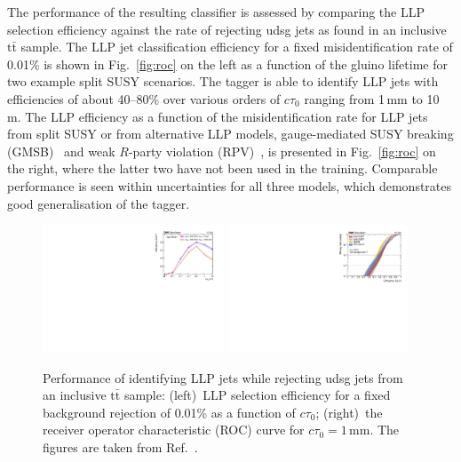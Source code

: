 \documentclass{webofc}
\newcommand{\ctau}{\ensuremath{c\tau_{0}}\xspace}
\newcommand{\ttbar}{\ensuremath{\textrm{t}\bar{\textrm{t}}}\xspace}
\begin{document}
The performance of the resulting classifier is assessed by comparing the LLP selection efficiency against the rate of rejecting udsg jets as found in an inclusive \ttbar sample. The LLP jet classification efficiency for a fixed misidentification rate of 0.01\% is shown in Fig.~\ref{fig:roc} on the left as a function of the gluino lifetime for two example split SUSY scenarios. The tagger is able to identify LLP jets with efficiencies of about 40--80\% over various orders of \ctau ranging from 1\,\textrm{mm} to 10\,\textrm{m}. The LLP efficiency as a function of the misidentification rate for LLP jets from split SUSY or from alternative LLP models, gauge-mediated SUSY breaking (GMSB)~\cite{gmsb} and weak $R$-party violation (RPV)~\cite{rpv}, is presented in Fig.~\ref{fig:roc} on the right, where the latter two have not been used in the training. Comparable performance is seen within uncertainties for all three models, which demonstrates good generalisation of the tagger. 

\begin{figure}[!ht]
\includegraphics[width=0.48\textwidth]{figs/ctau.pdf}\hspace{0.03\textwidth}
\includegraphics[width=0.48\textwidth]{figs/roc_1.pdf}
\centering
\caption{\label{fig:roc}Performance of identifying LLP jets while rejecting udsg jets from an inclusive \ttbar sample: (left)~LLP selection efficiency for a fixed background rejection of 0.01\% as a function of \ctau; (right)~the receiver operator characteristic (ROC) curve for $\ctau=1\,\textrm{mm}$. The figures are taken from Ref.~\cite{CMS-EXO-19-011}.}
\label{fig-3}
\end{figure}
\end{document}
